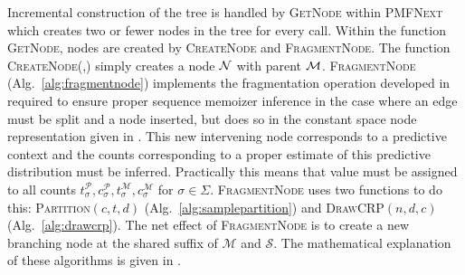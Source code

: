 Incremental construction of the tree is handled by \textsc{GetNode} within \textsc{PMFNext} which creates two or fewer nodes in the tree for every call.  Within the function \textsc{GetNode}, nodes are created by \textsc{CreateNode} and \textsc{FragmentNode}. The function \textsc{CreateNode(\N,\M)} simply creates a node $\N$ with parent $\M$. \textsc{FragmentNode} (Alg.~\ref{alg:fragmentnode}) implements the fragmentation operation developed in \citep{Wood2009} required to ensure proper sequence memoizer inference in the case where an edge must be split and a node inserted, but does so in the constant space node representation given in \citep{Gasthaus2011}.  This new intervening node corresponds to a predictive context and the counts corresponding to a proper estimate of this predictive distribution must be inferred.   Practically this means that value must be assigned to all counts $t_\sigma^\mathcal{P}, c_\sigma^\mathcal{P}, t_\sigma^\mathcal{M}, c_\sigma^\mathcal{M}$ for $\sigma \in\Sigma$.  \textsc{FragmentNode} uses two functions to do this: \textsc{Partition}$(c,t,d)$ (Alg.~\ref{alg:samplepartition}) and \textsc{DrawCRP}$(n,d,c)$ (Alg.~\ref{alg:drawcrp}).  The net effect of \textsc{FragmentNode} is to create a new branching node at the shared suffix of $\mathcal{M}$ and $\mathcal{S}.$   The mathematical explanation of these algorithms is given in \citep{Gasthaus2011}.  %

